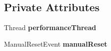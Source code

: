 \subsection*{Private Attributes}
\begin{DoxyCompactItemize}
\item 
\hypertarget{class_csound_unity_bridge_ab96830a139ffd9e3822ce98419bd2d72}{}Thread {\bfseries performance\+Thread}\label{class_csound_unity_bridge_ab96830a139ffd9e3822ce98419bd2d72}

\item 
\hypertarget{class_csound_unity_bridge_af281f1fe24fab0e9d14dd00f202cac68}{}Manual\+Reset\+Event {\bfseries manual\+Reset}\label{class_csound_unity_bridge_af281f1fe24fab0e9d14dd00f202cac68}

\end{DoxyCompactItemize}
